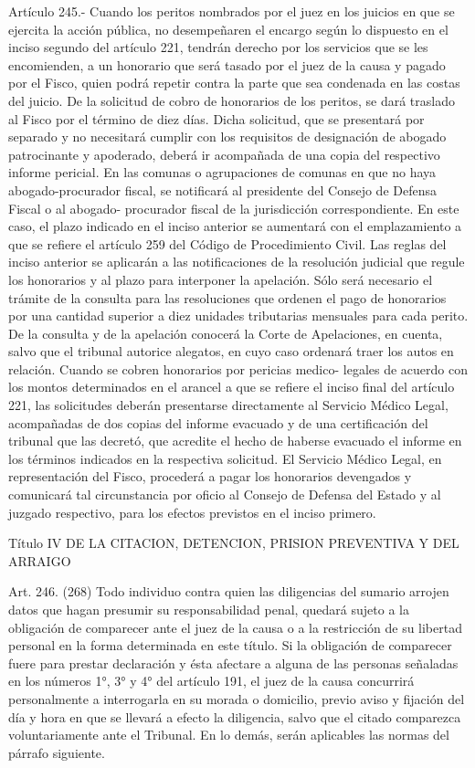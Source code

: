     Artículo 245.- Cuando los peritos nombrados por el juez en los juicios en que se ejercita la acción pública, no desempeñaren el encargo según lo dispuesto en el inciso segundo del artículo 221, tendrán derecho por los servicios que se les encomienden, a un honorario que será tasado por el juez de la causa y pagado por el Fisco, quien podrá repetir contra la parte que sea condenada en las costas del juicio.
    De la solicitud de cobro de honorarios de los peritos, se dará traslado al Fisco por el término de diez días. Dicha solicitud, que se presentará por separado y no necesitará cumplir con los requisitos de designación de abogado patrocinante y apoderado, deberá ir acompañada de una copia del respectivo informe pericial.
    En las comunas o agrupaciones de comunas en que no haya abogado-procurador fiscal, se notificará al presidente del Consejo de Defensa Fiscal o al abogado- procurador fiscal de la jurisdicción correspondiente. En este caso, el plazo indicado en el inciso anterior se aumentará con el emplazamiento a que se refiere el artículo 259 del Código de Procedimiento Civil.
    Las reglas del inciso anterior se aplicarán a las notificaciones de la resolución judicial que regule los honorarios y al plazo para interponer la apelación.
    Sólo será necesario el trámite de la consulta para las resoluciones que ordenen el pago de honorarios por una cantidad superior a diez unidades tributarias mensuales para cada perito.  De la consulta y de la apelación conocerá la Corte de Apelaciones, en cuenta, salvo que el tribunal autorice alegatos, en cuyo caso ordenará traer los autos en relación.
    Cuando se cobren honorarios por pericias medico- legales de acuerdo con los montos determinados en el arancel a que se refiere el inciso final del artículo 221, las solicitudes deberán presentarse directamente al Servicio Médico Legal, acompañadas de dos copias del informe evacuado y de una certificación del tribunal que las decretó, que acredite el hecho de haberse evacuado el informe en los términos indicados en la respectiva solicitud.
    El Servicio Médico Legal, en representación del Fisco, procederá a pagar los honorarios devengados y comunicará tal circunstancia por oficio al Consejo de Defensa del Estado y al juzgado respectivo, para los efectos previstos en el inciso primero.

  Título IV
  DE LA CITACION, DETENCION, PRISION PREVENTIVA Y DEL
ARRAIGO

    Art. 246. (268) Todo individuo contra quien las diligencias del sumario arrojen datos que hagan presumir su responsabilidad penal, quedará sujeto a la obligación de comparecer ante el juez de la causa o a la restricción de su libertad personal en la forma determinada en este título.
    Si la obligación de comparecer fuere para prestar declaración y ésta afectare a alguna de las personas señaladas en los números 1°, 3° y 4° del artículo 191, el juez de la causa concurrirá personalmente a interrogarla en su morada o domicilio, previo aviso y fijación del día y hora en que se llevará a efecto la diligencia, salvo que el citado comparezca voluntariamente ante el Tribunal. En lo demás, serán aplicables las normas del párrafo siguiente.

